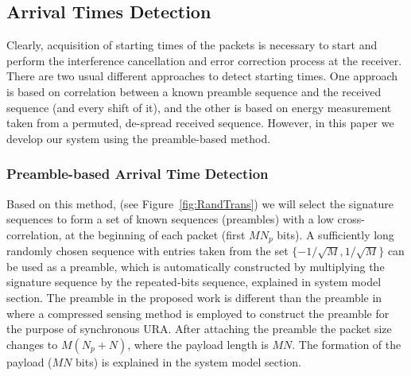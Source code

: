 \documentclass[journal,onecolumn,12pt]{IEEEtran}
\begin{document}

\subsection{Arrival Times Detection} \label{sec:ATD}
Clearly, acquisition of starting times of the packets is necessary to start and perform the interference cancellation and error correction process at the receiver. There are two usual different approaches to detect starting times. One approach is based on correlation between a known preamble sequence and the received sequence (and every shift of it), and the other is based on energy measurement taken from a permuted, de-spread received sequence. However, in this paper we develop our system using the preamble-based method.

\subsubsection{Preamble-based Arrival Time Detection} \label{sec:PATD}
 Based on this method, (see Figure~\ref{fig:RandTrans}) we will select the signature sequences to form a set of known sequences (preambles) with a low cross-correlation, at the beginning of each packet (first $MN_p$ bits). A sufficiently long randomly chosen sequence with entries taken from the set $\{-1/\sqrt{M}, 1/\sqrt{M}\}$ can be used as a preamble, which is automatically constructed by multiplying the signature sequence by the repeated-bits sequence, explained in system model section. The preamble in the proposed work is different than the preamble in~\cite{TBKN20} where a compressed sensing method is employed to construct the preamble for the purpose of synchronous URA. After attaching the preamble the packet size changes to $M(N_p+N)$, where the payload length is $MN$. The formation of the payload ($MN$ bits) is  explained in the system model section.
\end{document}
